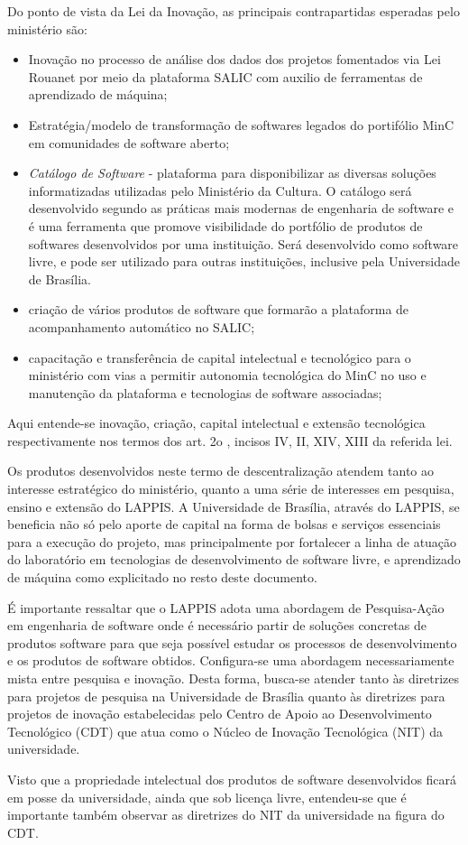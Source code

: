 Do ponto de vista da Lei da Inovação, as principais contrapartidas esperadas pelo ministério são:
\begin{itemize}
 \item Inovação no processo de análise dos dados dos projetos fomentados via Lei Rouanet por meio da plataforma SALIC com auxilio 
 de ferramentas de aprendizado de máquina;
 \item Estratégia/modelo de transformação de softwares legados do portifólio MinC em comunidades de software aberto;
 \item \textit{Catálogo de Software} - plataforma para disponibilizar as diversas soluções informatizadas utilizadas pelo Ministério da
 Cultura. O catálogo será desenvolvido segundo as práticas mais modernas de engenharia de software e é uma ferramenta que promove visibilidade
 do portfólio de produtos de softwares desenvolvidos por uma instituição. Será desenvolvido como software livre, 
 e pode ser utilizado para outras instituições, inclusive pela Universidade de Brasília.
 \item criação de vários produtos de software que formarão a plataforma de acompanhamento automático no SALIC; 
 \item capacitação e transferência de capital intelectual e tecnológico para o ministério com vias a permitir autonomia tecnológica 
 do MinC no uso e manutenção da plataforma e tecnologias de software associadas; 
 \end{itemize}

Aqui entende-se inovação, criação, capital intelectual e extensão tecnológica respectivamente nos termos dos art. 2o , 
incisos IV, II, XIV, XIII da referida lei.

Os produtos desenvolvidos neste termo de descentralização atendem tanto ao interesse estratégico do ministério, quanto a uma série de interesses 
em pesquisa, ensino e extensão do LAPPIS. A Universidade de Brasília, através do LAPPIS, se beneficia não só pelo aporte de capital
na forma de bolsas e serviços essenciais para a execução do projeto, mas principalmente por fortalecer a linha de atuação do laboratório 
em tecnologias de desenvolvimento de software livre, e aprendizado de máquina como explicitado no resto 
deste documento.

É importante ressaltar que o LAPPIS adota uma abordagem de Pesquisa-Ação em engenharia de software onde é necessário partir de
soluções concretas de produtos software para que seja possível estudar os processos de desenvolvimento e os produtos de software obtidos. 
Configura-se uma abordagem necessariamente mista entre pesquisa e inovação. Desta forma, busca-se atender tanto às diretrizes para projetos 
de pesquisa na Universidade de Brasília quanto às diretrizes para projetos de inovação estabelecidas pelo Centro de Apoio ao Desenvolvimento 
Tecnológico (CDT) que atua como o Núcleo de Inovação Tecnológica (NIT) da universidade.

Visto que a propriedade intelectual dos produtos de software desenvolvidos ficará em posse da universidade, ainda que sob licença livre, 
entendeu-se que é importante também observar as diretrizes do NIT da universidade na figura do CDT.

